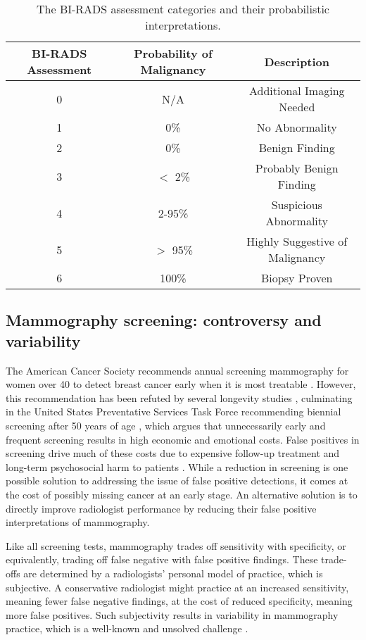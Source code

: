 \begin{table}[h!]
\centering
\begin{tabular}{|c|c|c|}
	\hline  BI-RADS Assessment&  Probability of Malignancy & Description \\ 
	\hline\hline
	0& N/A & Additional Imaging Needed \\ 
	\hline
	1& 0\% & No Abnormality \\ 
	\hline  
	2& 0\% & Benign Finding  \\ 
	\hline  
	3& $<$ 2\% & Probably Benign Finding \\ 
	\hline  
	4& 2-95\% & Suspicious Abnormality \\ 
	\hline  
	5& $>$ 95\% & Highly Suggestive of Malignancy \\ 
	\hline  
	6& 100\% & Biopsy Proven \\ 
	\hline 
\end{tabular}
\caption{The BI-RADS assessment categories and their probabilistic interpretations.}
\label{table:birads}
\end{table}

\subsection{Mammography screening: controversy and variability}
The American Cancer Society recommends annual screening mammography for women over 40 to detect breast cancer early when it is most treatable \cite{Nystrom:2002hb, Smith:2003en, Smart:1997hk}. However, this recommendation has been refuted by several longevity studies \cite{Bleyer:2012dc, Kalager:2012ez},  culminating in the United States Preventative Services Task Force recommending biennial screening after 50 years of age \cite{Kerlikowske:2013ej, Anonymous:2009fl}, which argues that unnecessarily early and frequent screening results in high economic and emotional costs.  False positives in screening drive much of these costs due to expensive follow-up treatment and long-term psychosocial harm to patients \cite{Kerlikowske:2013ej, Brodersen:2013kq}. While a reduction in screening is one possible solution to addressing the issue of false positive detections, it comes at the cost of possibly missing cancer at an early stage. An alternative solution is to directly improve radiologist performance by reducing their false positive interpretations of mammography. 

Like all screening tests, mammography trades off sensitivity with specificity, or equivalently, trading off false negative with false positive findings. These trade-offs are determined by a radiologists' personal model of practice, which is subjective. A conservative radiologist might practice at an increased sensitivity, meaning fewer false negative findings, at the cost of reduced specificity, meaning more false positives. Such subjectivity results in variability in mammography practice, which is a well-known and unsolved challenge \cite{Elmore:2009vu, Elmore:2012er, Beam:1996ui, Taplin:2008bv}. 

